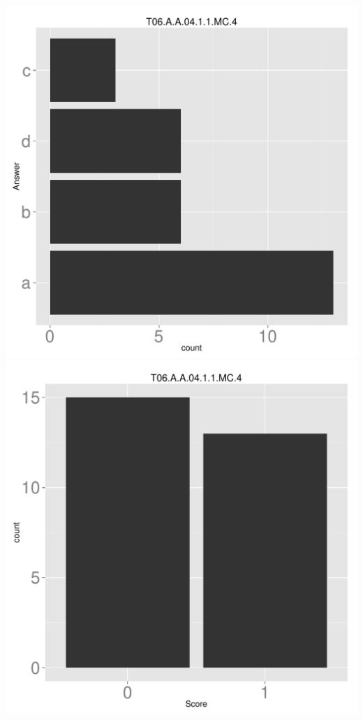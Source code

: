 \documentclass[12pt,nohyper]{tufte-handout}\usepackage[]{graphicx}\usepackage[]{color}
\begin{document}
\begin{center} \includegraphics[width=.45\linewidth]{Topic06_4_answer} \includegraphics[width=.45\linewidth]{Topic06_4_score} \end{center} 
\end{document}
